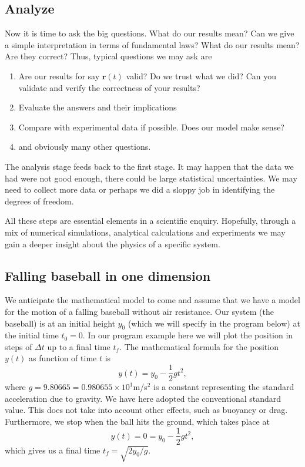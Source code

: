 \documentclass[%
oneside,                 %
final,                   %
10pt]{article}
\begin{document}
\subsection{Analyze}

Now it is time to ask the big questions. What do our results mean? Can we give a simple interpretation in terms of fundamental laws?  What do our results mean? Are they correct?
Thus, typical questions we may ask are
\begin{enumerate}
\item Are our results for say $\bm{r}(t)$ valid?  Do we trust what we did?  Can you validate and verify the correctness of your results?

\item Evaluate the answers and their implications

\item Compare with experimental data if possible. Does our model make sense?

\item and obviously many other questions.
\end{enumerate}

\noindent
The analysis stage feeds back to the first stage. It may happen that
the data we had were not good enough, there could be large statistical
uncertainties. We may need to collect more data or perhaps we did a
sloppy job in identifying the degrees of freedom.

All these steps are essential elements in a scientific
enquiry. Hopefully, through a mix of numerical simulations, analytical
calculations and experiments we may gain a deeper insight about the
physics of a specific system.

\subsection{Falling baseball in one dimension}

We anticipate the mathematical model to come and assume that we have a
model for the motion of a falling baseball without air resistance.
Our system (the baseball) is at an initial height $y_0$ (which we will
specify in the program below) at the initial time $t_0=0$. In our program example here we will plot the position in steps of $\Delta t$ up to a final time $t_f$. 
The mathematical formula for the position $y(t)$ as function of time $t$ is 
\[
y(t) = y_0-\frac{1}{2}gt^2,
\]
where $g=9.80665=0.980655\times 10^1$m/s${}^2$ is a constant representing the standard acceleration due to gravity.
We have here adopted the conventional standard value. This does not take into account other effects, such as buoyancy or drag.
Furthermore, we stop when the ball hits the ground, which takes place at
\[
y(t) = 0= y_0-\frac{1}{2}gt^2,
\]
which gives us a final time $t_f=\sqrt{2y_0/g}$. 
\end{document}
